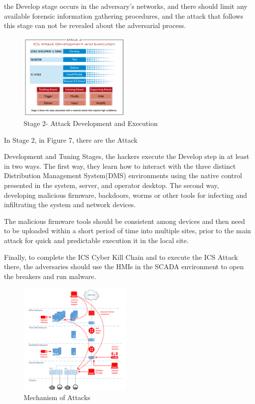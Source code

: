 \documentclass[conference]{IEEEtran}
\begin{document}
 the Develop stage occurs in the adversary’s networks, and there should limit any available forensic
information gathering procedures, and the attack that follows this stage can not be revealed  about the adversarial process.
\begin{figure}[!htb]
	\includegraphics[width=0.49\textwidth]{STAGE2.png}
	\caption{ Stage 2- Attack Development and Execution }
	\label{fig:TCPIP}
\end{figure}

In Stage 2, in Figure 7, there are the Attack

Development and Tuning Stages, the hackers execute the Develop step in at least in two ways. The first way, they learn how to interact with the three distinct Distribution Management System(DMS) environments using the native control presented in the system, server, and operator desktop. The second way, developing malicious firmware, backdoors, worms or other tools for infecting and infiltrating the system and network devices.

The malicious firmware tools should be consistent among devices and then need to be uploaded within a short period of time into multiple sites, prior to the main attack for quick and predictable execution it in the local site. 

Finally, to complete the ICS Cyber Kill Chain and to execute the ICS Attack there, the adversaries should use the HMIs in the SCADA environment to open the breakers and run malware.	
	
\begin{figure}[!htb]
	\includegraphics[width=0.49\textwidth]{images/SCADAATACK.png}
	\caption{Mechanism of Attacks %
	}
	\label{fig:fb}
\end{figure}
\end{document}
